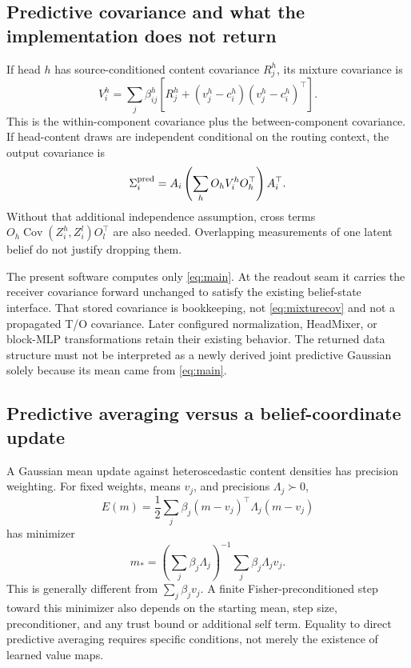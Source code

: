 \documentclass[11pt,letterpaper]{article}
\newcommand{\Cov}{\operatorname{Cov}}
\begin{document}
\subsection{Predictive covariance and what the implementation does not return}
If head $h$ has source-conditioned content covariance $R_j^h$, its mixture covariance is
\begin{equation}
 V_i^h=\sum_j\beta_{ij}^h\left[R_j^h+
 (v_j^h-c_i^h)(v_j^h-c_i^h)^\top\right].
 \label{eq:mixturecov}
\end{equation}
This is the within-component covariance plus the between-component covariance. If head-content draws are independent conditional on the routing context, the output covariance is
\begin{equation}
 \Sigma_i^{\rm pred}=A_i\left(\sum_h O_hV_i^hO_h^\top\right)A_i^\top.
\end{equation}
Without that additional independence assumption, cross terms $O_h\Cov(Z_i^h,Z_i^l)O_l^\top$ are also needed. Overlapping measurements of one latent belief do not justify dropping them.

The present software computes only \eqref{eq:main}. At the readout seam it carries the receiver covariance forward unchanged to satisfy the existing belief-state interface. That stored covariance is bookkeeping, not \eqref{eq:mixturecov} and not a propagated T/O covariance. Later configured normalization, HeadMixer, or block-MLP transformations retain their existing behavior. The returned data structure must not be interpreted as a newly derived joint predictive Gaussian solely because its mean came from \eqref{eq:main}.

\subsection{Predictive averaging versus a belief-coordinate update}
A Gaussian mean update against heteroscedastic content densities has precision weighting. For fixed weights, means $v_j$, and precisions $\Lambda_j\succ0$,
\begin{equation}
 E(m)=\frac12\sum_j\beta_j(m-v_j)^\top\Lambda_j(m-v_j)
\end{equation}
has minimizer
\begin{equation}
 m_*=\left(\sum_j\beta_j\Lambda_j\right)^{-1}
       \sum_j\beta_j\Lambda_jv_j.
\end{equation}
This is generally different from $\sum_j\beta_jv_j$. A finite Fisher-preconditioned step toward this minimizer also depends on the starting mean, step size, preconditioner, and any trust bound or additional self term. Equality to direct predictive averaging requires specific conditions, not merely the existence of learned value maps.
\end{document}
